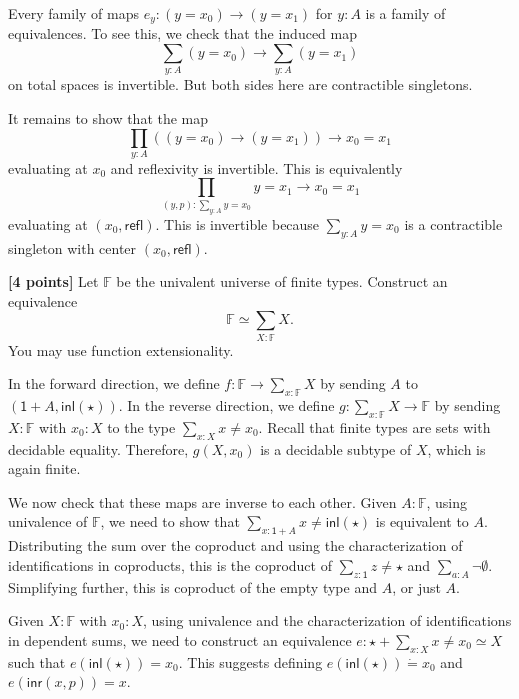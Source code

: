 \documentclass[11pt]{article}
\newcommand{\F}{\mathbb{F}}
\newcommand{\judgeq}{\mathrel{\dot{=}}}
\newcommand{\refl}{\mathsf{refl}}
\newcommand{\inl}{\mathsf{inl}}
\newcommand{\inr}{\mathsf{inr}}
\newcommand{\Unit}{\mathsf{1}}
\newcommand{\unit}{\star}
\begin{document}
\begin{problems}
{Every family of maps $e_y : (y = x_0) \to (y = x_1)$ for $y : A$ is a family of equivalences.
To see this, we check that the induced map
\[
\sum_{y:A} (y = x_0) \to \sum_{y:A} (y = x_1)
\]
on total spaces is invertible.
But both sides here are contractible singletons.

It remains to show that the map
\[
\prod_{y : A} ((y = x_0) \to (y = x_1)) \longrightarrow x_0 = x_1
\]
evaluating at $x_0$ and reflexivity is invertible.
This is equivalently
\[
\prod_{(y, p) : \sum_{y : A} y = x_0} y = x_1 \longrightarrow x_0 = x_1
\]
evaluating at $(x_0, \refl)$.
This is invertible because $\sum_{y : A} y = x_0$ is a contractible singleton with center $(x_0, \refl)$.
}

\item \label{finite-types-add-point}
\textbf{[4 points]}
Let $\F$ be the univalent universe of finite types.
Construct an equivalence
\[
\F \simeq \sum_{X:\F} X
.\]
You may use function extensionality.

{\color{purple}
In the forward direction, we define $f : \F \to \sum_{x : \F} X$ by sending $A$ to $(\Unit + A, \inl(\unit))$.
In the reverse direction, we define $g : \sum_{x : \F} X \to \F$ by sending $X : \F$ with $x_0 : X$ to the type $\sum_{x : X} x \neq x_0$.
Recall that finite types are sets with decidable equality.
Therefore, $g(X, x_0)$ is a decidable subtype of $X$, which is again finite.

We now check that these maps are inverse to each other.
Given $A : \F$, using univalence of $\F$, we need to show that $\sum_{x : \Unit + A} x \neq \inl(\unit)$ is equivalent to $A$.
Distributing the sum over the coproduct and using the characterization of identifications in coproducts, this is the coproduct of $\sum_{z : \Unit} z \neq \unit$ and $\sum_{a : A} \neg \emptyset$.
Simplifying further, this is coproduct of the empty type and $A$, or just $A$.

Given $X : \F$ with $x_0 : X$, using univalence and the characterization of identifications in dependent sums, we need to construct an equivalence $e : \unit + \sum_{x : X} x \neq x_0 \simeq X$ such that $e(\inl(\unit)) = x_0$.
This suggests defining $e(\inl(\unit)) \judgeq x_0$ and $e(\inr(x, p)) = x$.

}

\end{problems}
\end{document}
